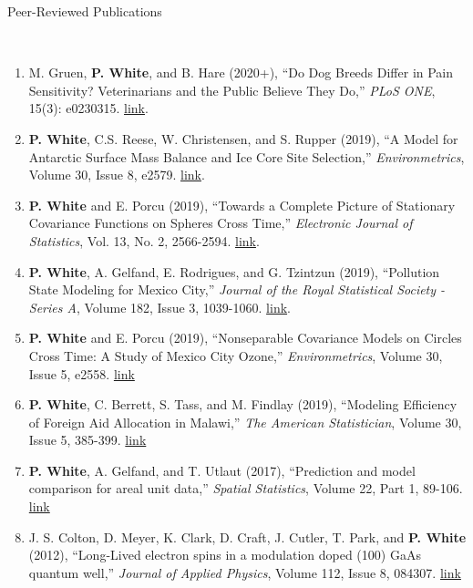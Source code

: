 \documentclass[12pt]{article}
\newcommand{\head}[1]{ %
    \bigskip %
    \begin{large}\begin{bf}{#1}\end{bf}\end{large} %

    \ \\ [-1.3cm] %

    \hrulefill}
\begin{document}
\vspace{2mm}
\head{Peer-Reviewed Publications}

\begin{enumerate}[label=$\bullet$]
\item M. Gruen, \textbf{P. White}, and B. Hare (2020+), ``Do Dog Breeds Differ in Pain Sensitivity? Veterinarians and the Public Believe They Do,'' \emph{PLoS ONE}, 15(3): e0230315. \href{https://doi.org/10.1371/journal.pone.0230315}{link}.
\item \textbf{P. White}, C.S. Reese, W. Christensen, and S. Rupper (2019), ``A Model for Antarctic Surface Mass Balance and Ice Core Site Selection,'' \emph{Environmetrics}, Volume 30, Issue 8, e2579. \href{https://onlinelibrary.wiley.com/doi/abs/10.1002/env.2579}{link}.
\item \textbf{P. White} and E. Porcu (2019), ``Towards a Complete Picture of Stationary Covariance Functions on Spheres Cross Time,'' \emph{Electronic Journal of Statistics}, Vol. 13, No. 2, 2566-2594. \href{https://doi.org/10.1214/19-EJS1593}{link}.
\item \textbf{P. White}, A. Gelfand, E. Rodrigues, and G. Tzintzun (2019), ``Pollution State Modeling for Mexico City,'' \emph{Journal of the Royal Statistical Society - Series A}, Volume 182, Issue 3, 1039-1060. \href{https://rss.onlinelibrary.wiley.com/doi/abs/10.1111/rssa.12444}{link}.
\item \textbf{P. White} and E. Porcu (2019), ``Nonseparable Covariance Models on Circles Cross Time: A Study of Mexico City Ozone,'' \emph{Environmetrics}, Volume 30, Issue 5, e2558. \href{https://onlinelibrary.wiley.com/doi/full/10.1002/env.2558}{link}
\item \textbf{P. White}, C. Berrett, S. Tass, and M. Findlay (2019), ``Modeling Efficiency of Foreign Aid Allocation in Malawi,'' \emph{The American Statistician}, Volume 30, Issue 5, 385-399.  \href{https://www.tandfonline.com/doi/full/10.1080/00031305.2018.1470032}{link}
\item \textbf{P. White}, A. Gelfand, and T. Utlaut (2017), ``Prediction and model comparison for areal unit data,'' \emph{Spatial Statistics}, Volume 22, Part 1, 89-106. \href{http://www.sciencedirect.com/science/article/pii/S2211675317301422}{link}
\item J. S. Colton, D. Meyer, K. Clark, D. Craft, J. Cutler, T. Park, and \textbf{P. White} (2012), ``Long-Lived electron spins in a modulation doped (100) GaAs quantum well,'' \emph{Journal of Applied Physics}, Volume 112, Issue 8, 084307.  \href{http://aip.scitation.org/doi/abs/10.1063/1.4759320}{link}
\end{enumerate}
\end{document}
